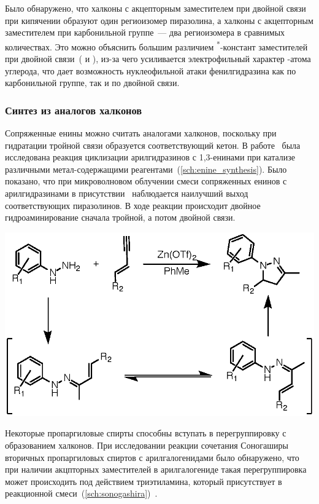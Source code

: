 Было обнаружено, что халконы с акцепторным заместителем при двойной связи при кипячении образуют один региоизомер пиразолина, а халконы с акцепторным заместителем при карбонильной группе~--- два региоизомера в сравнимых количествах.
Это можно объяснить большим различием \chemsigma\textsuperscript{*}-констант заместителей при двойной связи~( и ), из-за чего усиливается электрофильный характер \chembeta-атома углерода, что дает возможность нуклеофильной атаки фенилгидразина как по карбонильной группе, так и по двойной связи.

\subsubsection{Синтез из аналогов халконов}
Сопряженные енины можно считать аналогами халконов, поскольку при гидратации тройной связи образуется соответствующий кетон.
В работе~\cite{Patil2011} была исследована реакция циклизации арилгидразинов с 1,3-енинами при катализе различными метал-содержащими реагентами~(\ref{sch:enine_synthesis}).
Было показано, что при микроволновом облучении смеси сопряженных енинов с арилгидразинами в присутствии~ наблюдается наилучший выход соответствующих пиразолинов.
В ходе реакции происходит двойное гидроаминирование сначала тройной, а потом двойной связи.

\begin{scheme}
    \centering
    \includegraphics{sections/literature/img/enine_synthesis.eps}
    \caption{}
    \label{sch:enine_synthesis}
\end{scheme}

Некоторые пропаргиловые спирты способны вступать в перегруппировку с образованием халконов.
При исследовании реакции сочетания Соногаширы вторичных пропаргиловых спиртов с арилгалогенидами было обнаружено, что при наличии акцпторных заместителей в арилгалогениде такая перегруппировка может происходить под действием триэтиламина, который присутствует в реакционной смеси~(\ref{sch:sonogashira})~\cite{Muller2000}.

